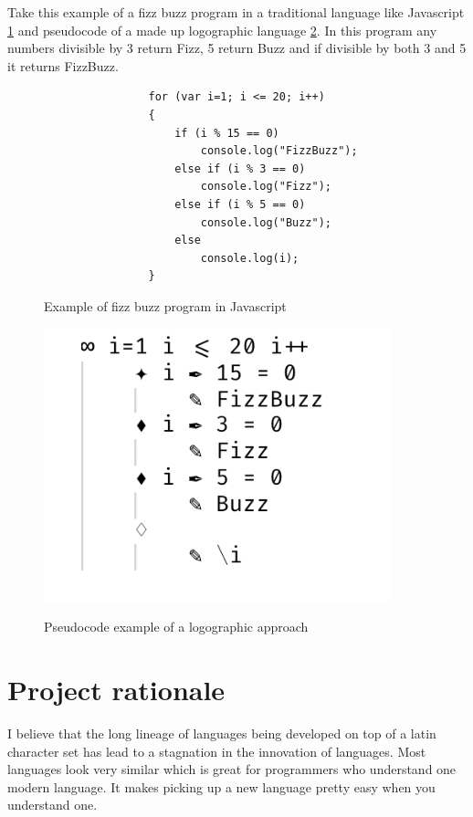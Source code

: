 \documentclass[12pt]{article}
\begin{document}
Take this example of a fizz buzz program in a traditional language like Javascript \ref{fig:javascript} and pseudocode of a made up logographic language \ref{fig:logographic}.
In this program any numbers divisible by 3 return Fizz, 5 return Buzz and if divisible by both 3 and 5 it returns FizzBuzz.

\begin{figure}[h]
    \caption{Example of fizz buzz program in Javascript}
    \centering
    \begin{verbatim}
                for (var i=1; i <= 20; i++)
                {
                    if (i % 15 == 0)
                        console.log("FizzBuzz");
                    else if (i % 3 == 0)
                        console.log("Fizz");
                    else if (i % 5 == 0)
                        console.log("Buzz");
                    else
                        console.log(i);
                }
    \end{verbatim}
    \label{fig:javascript}
\end{figure}    

\begin{figure}[ht]
    \caption{Pseudocode example of a logographic approach}
    \centering
    \includegraphics[width=10cm]{logograph}
    \label{fig:logographic}
\end{figure}

\section{Project rationale}

I believe that the long lineage of languages being developed on top of a latin character set
has lead to a stagnation in the innovation of languages. Most languages look very similar which is
great for programmers who understand one modern language. It makes picking up a new language pretty easy
when you understand one.
\end{document}

